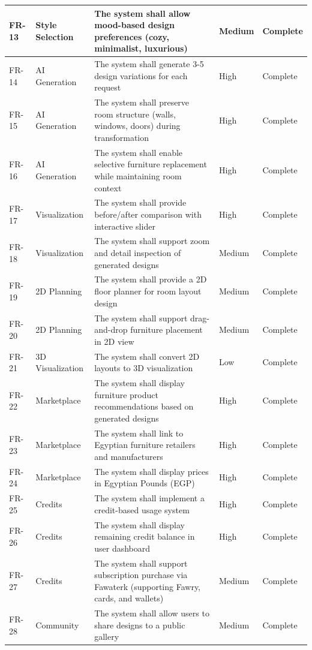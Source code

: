 \begin{longtable}{|p{1.2cm}|p{2.8cm}|p{5.4cm}|p{1.5cm}|p{1.8cm}|}
    \hline
    FR-13 & Style Selection & The system shall allow mood-based design preferences (cozy, minimalist, luxurious) & Medium & Complete \\
    \hline
    FR-14 & AI Generation & The system shall generate 3-5 design variations for each request & High & Complete \\
    \hline
    FR-15 & AI Generation & The system shall preserve room structure (walls, windows, doors) during transformation & High & Complete \\
    \hline
    FR-16 & AI Generation & The system shall enable selective furniture replacement while maintaining room context & High & Complete \\
    \hline
    FR-17 & Visualization & The system shall provide before/after comparison with interactive slider & High & Complete \\
    \hline
    FR-18 & Visualization & The system shall support zoom and detail inspection of generated designs & Medium & Complete \\
    \hline
    FR-19 & 2D Planning & The system shall provide a 2D floor planner for room layout design & Medium & Complete \\
    \hline
    FR-20 & 2D Planning & The system shall support drag-and-drop furniture placement in 2D view & Medium & Complete \\
    \hline
    FR-21 & 3D Visualization & The system shall convert 2D layouts to 3D visualization & Low & Complete \\
    \hline
    FR-22 & Marketplace & The system shall display furniture product recommendations based on generated designs & High & Complete \\
    \hline
    FR-23 & Marketplace & The system shall link to Egyptian furniture retailers and manufacturers & High & Complete \\
    \hline
    FR-24 & Marketplace & The system shall display prices in Egyptian Pounds (EGP) & High & Complete \\
    \hline
    FR-25 & Credits & The system shall implement a credit-based usage system & High & Complete \\
    \hline
    FR-26 & Credits & The system shall display remaining credit balance in user dashboard & High & Complete \\
    \hline
    FR-27 & Credits & The system shall support subscription purchase via Fawaterk (supporting Fawry, cards, and wallets) & Medium & Complete \\
    \hline
    FR-28 & Community & The system shall allow users to share designs to a public gallery & Medium & Complete \\

\end{longtable}
